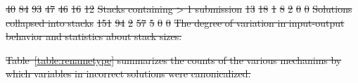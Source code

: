 \documentclass[12pt,twoside]{mitthesis}
\providecommand{\DIFdeltex}[1]{{\protect\color{red}\sout{#1}}}                      %
\providecommand{\DIFdelFL}[1]{\DIFdel{#1}} %
\providecommand{\DIFdel}[1]{\texorpdfstring{\DIFdeltex{#1}}{}} %
\begin{document}
{{{{{{{{{{\DIFdelFL{40 }%
\DIFdelFL{84 }%
\DIFdelFL{93 }%
\DIFdelFL{47 }%
\DIFdelFL{46 }%
\DIFdelFL{16 }%
\DIFdelFL{12 }%
\DIFdelFL{Stacks containing > 1 submission }%
\DIFdelFL{13 }%
\DIFdelFL{18 }%
\DIFdelFL{1 }%
\DIFdelFL{8 }%
\DIFdelFL{2 }%
\DIFdelFL{0 }%
\DIFdelFL{0 }%
\DIFdelFL{Solutions collapsed into stacks }%
\DIFdelFL{151 }%
\DIFdelFL{94 }%
\DIFdelFL{2 }%
\DIFdelFL{57 }%
\DIFdelFL{5 }%
\DIFdelFL{0 }%
\DIFdelFL{0 }%
{%
\DIFdelFL{The degree of variation in input-output behavior and statistics about stack sizes.}}

\DIFdel{Table~\ref{table:renametype} summarizes the counts of the various mechanims by which variables in incorrect solutions were canonicalized.
}%

}}}}}}}}}}
\end{document}
